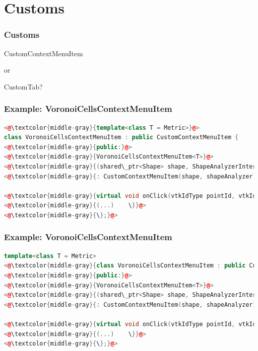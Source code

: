 \documentclass[compress]{beamer}
\begin{document}
\section{Customs}

\begin{frame}[c]
\frametitle{Customs}
\begin{center}

\huge CustomContextMenuItem

\vspace{1em}

or

\vspace{1em}

CustomTab?
\end{center}
\end{frame}

\begin{frame}[fragile]
\frametitle{Example: VoronoiCellsContextMenuItem}

\begin{lstlisting}[language=C++, numbers=none]
<@\textcolor{middle-gray}{template<class T = Metric>}@>
class VoronoiCellsContextMenuItem : public CustomContextMenuItem {
<@\textcolor{middle-gray}{public:}@>
<@\textcolor{middle-gray}{VoronoiCellsContextMenuItem<T>}@>
<@\textcolor{middle-gray}{(shared\_ptr<Shape> shape, ShapeAnalyzerInterface* shapeAnalyzer)}@>
<@\textcolor{middle-gray}{: CustomContextMenuItem(shape, shapeAnalyzer) \{ \}}@>

<@\textcolor{middle-gray}{virtual void onClick(vtkIdType pointId, vtkIdType faceId, QWidget* parent) \{}@>
<@\textcolor{middle-gray}{(...)    \}}@>
<@\textcolor{middle-gray}{\};}@>
\end{lstlisting}

\end{frame}

\begin{frame}[fragile]
\frametitle{Example: VoronoiCellsContextMenuItem}

\begin{lstlisting}[language=C++, numbers=none]
template<class T = Metric>
<@\textcolor{middle-gray}{class VoronoiCellsContextMenuItem : public CustomContextMenuItem \{}@>
<@\textcolor{middle-gray}{public:}@>
<@\textcolor{middle-gray}{VoronoiCellsContextMenuItem<T>}@>
<@\textcolor{middle-gray}{(shared\_ptr<Shape> shape, ShapeAnalyzerInterface* shapeAnalyzer)}@>
<@\textcolor{middle-gray}{: CustomContextMenuItem(shape, shapeAnalyzer) \{ \}}@>

<@\textcolor{middle-gray}{virtual void onClick(vtkIdType pointId, vtkIdType faceId, QWidget* parent) \{}@>
<@\textcolor{middle-gray}{(...)    \}}@>
<@\textcolor{middle-gray}{\};}@>
\end{lstlisting}

\end{frame}
\end{document}
